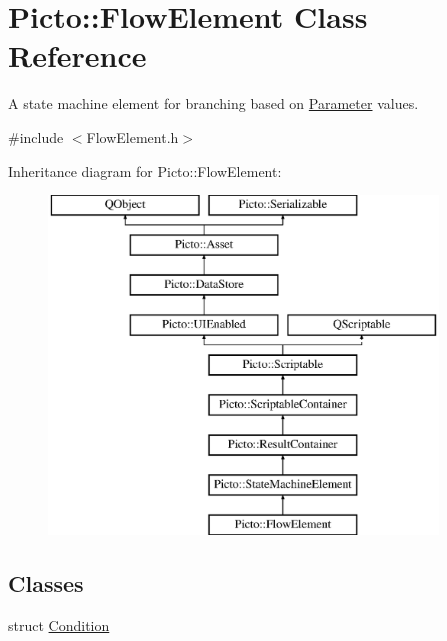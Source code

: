 \hypertarget{class_picto_1_1_flow_element}{\section{Picto\-:\-:Flow\-Element Class Reference}
\label{class_picto_1_1_flow_element}
}


A state machine element for branching based on \hyperlink{class_picto_1_1_parameter}{Parameter} values.  




{\ttfamily \#include $<$Flow\-Element.\-h$>$}

Inheritance diagram for Picto\-:\-:Flow\-Element\-:\begin{figure}[H]
\begin{center}
\leavevmode
\includegraphics[height=9.000000cm]{class_picto_1_1_flow_element}
\end{center}
\end{figure}
\subsection*{Classes}
\begin{DoxyCompactItemize}
\item 
struct \hyperlink{struct_picto_1_1_flow_element_1_1_condition}{Condition}
\end{DoxyCompactItemize}
